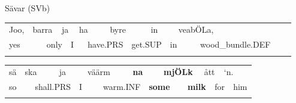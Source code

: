 \begin{listWWNumileveli}
\item {}

\begin{styleExample}
Sävar (SVb)

\end{styleExample}

\end{listWWNumileveli}

\begin{tabular}{llllllllllllllll}
\lsptoprule
Joo, & \multicolumn{2}{l}{barra

} & \multicolumn{2}{l}{ja

} & \multicolumn{2}{l}{ha

} & \multicolumn{2}{l}{byre

} & \multicolumn{2}{l}{in

} & \multicolumn{2}{l}{veabÖLa,

} & \multicolumn{2}{l}{} & \\
\multicolumn{2}{l}{yes

} & \multicolumn{2}{l}{only

} & \multicolumn{2}{l}{I

} & \multicolumn{2}{l}{have.PRS

} & \multicolumn{2}{l}{get.SUP

} & \multicolumn{2}{l}{in

} & \multicolumn{2}{l}{wood\_bundle.DEF

} & \multicolumn{2}{l}{}\\
\lspbottomrule
\end{tabular}

\begin{tabular}{llllllllllllllll}
\lsptoprule
sä & \multicolumn{2}{l}{ska

} & \multicolumn{2}{l}{ja

} & \multicolumn{2}{l}{väärm

} & \multicolumn{2}{l}{{\bfseries na}

} & \multicolumn{2}{l}{{\bfseries mjÖLk}

} & \multicolumn{2}{l}{ått

} & \multicolumn{2}{l}{‘n.

} & \\
\multicolumn{2}{l}{so

} & \multicolumn{2}{l}{shall.PRS

} & \multicolumn{2}{l}{I

} & \multicolumn{2}{l}{warm.INF

} & \multicolumn{2}{l}{{\bfseries some}

} & \multicolumn{2}{l}{{\bfseries milk}

} & \multicolumn{2}{l}{for 

} & \multicolumn{2}{l}{him

}\\
\lspbottomrule
\end{tabular}

